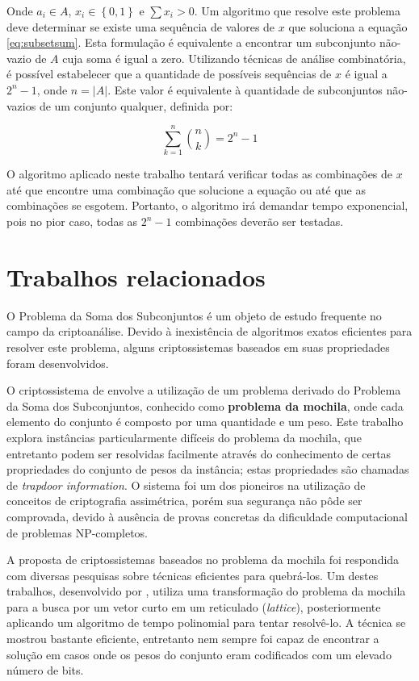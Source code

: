 \documentclass[12pt]{article}
\begin{document}
Onde $a_{i} \in A$, $x_{i} \in \left\{0, 1\right\}$ e $\sum x_{i} > 0$. Um algoritmo que resolve este problema deve determinar se existe uma sequência de valores de $x$ que soluciona a equação \ref{eq:subsetsum}. Esta formulação é equivalente a encontrar um subconjunto não-vazio de $A$ cuja soma é igual a zero. Utilizando técnicas de análise combinatória, é possível estabelecer que a quantidade de possíveis sequências de $x$ é igual a $2^{n} - 1$, onde $n = \left | A \right |$. Este valor é equivalente à quantidade de subconjuntos não-vazios de um conjunto qualquer, definida por:

\begin{equation} \label{eq:subsetcount}
    \sum_{k = 1}^{n} \binom{n}{k} = 2^{n} - 1
\end{equation}

O algoritmo aplicado neste trabalho tentará verificar todas as combinações de $x$ até que encontre uma combinação que solucione a equação ou até que as combinações se esgotem. Portanto, o algoritmo irá demandar tempo exponencial, pois no pior caso, todas as $2^{n} - 1$ combinações deverão ser testadas.

\section{Trabalhos relacionados} \label{sec:relatedwork}

O Problema da Soma dos Subconjuntos é um objeto de estudo frequente no campo da criptoanálise. Devido à inexistência de algoritmos exatos eficientes para resolver este problema, alguns criptossistemas baseados em suas propriedades foram desenvolvidos.

O criptossistema de \cite{Merkle1978} envolve a utilização de um problema derivado do Problema da Soma dos Subconjuntos, conhecido como \textbf{problema da mochila}, onde cada elemento do conjunto é composto por uma quantidade e um peso. Este trabalho explora instâncias particularmente difíceis do problema da mochila, que entretanto podem ser resolvidas facilmente através do conhecimento de certas propriedades do conjunto de pesos da instância; estas propriedades são chamadas de \textit{trapdoor information}. O sistema foi um dos pioneiros na utilização de conceitos de criptografia assimétrica, porém sua segurança não pôde ser comprovada, devido à ausência de provas concretas da dificuldade computacional de problemas NP-completos.

A proposta de criptossistemas baseados no problema da mochila foi respondida com diversas pesquisas sobre técnicas eficientes para quebrá-los. Um destes trabalhos, desenvolvido por \cite{Lagarias1985}, utiliza uma transformação do problema da mochila para a busca por um vetor curto em um reticulado (\textit{lattice}), posteriormente aplicando um algoritmo de tempo polinomial para tentar resolvê-lo. A técnica se mostrou bastante eficiente, entretanto nem sempre foi capaz de encontrar a solução em casos onde os pesos do conjunto eram codificados com um elevado número de bits.
\end{document}
